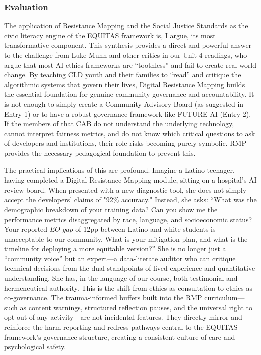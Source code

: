 \documentclass[11pt,twoside]{article}
\DeclareRobustCommand{\EOgap}{EO\text{-}gap\xspace}
\DeclareRobustCommand{\pp}{pp\xspace} %
\begin{document}
\newpage
\vspace{-0.3cm}
\subsubsection*{Evaluation}

\vspace{-0.3cm}
The application of Resistance Mapping and the Social Justice Standards as the civic literacy engine of the EQUITAS framework is, I argue, its most transformative component. This synthesis provides a direct and powerful answer to the challenge from Luke Munn and other critics in our Unit 4 readings, who argue that most AI ethics frameworks are “toothless” and fail to create real-world change. By teaching CLD youth and their families to “read” and critique the algorithmic systems that govern their lives, Digital Resistance Mapping builds the essential foundation for genuine community governance and accountability. It is not enough to simply create a Community Advisory Board (as suggested in Entry 1) or to have a robust governance framework like FUTURE-AI (Entry 2). If the members of that CAB do not understand the underlying technology, cannot interpret fairness metrics, and do not know which critical questions to ask of developers and institutions, their role risks becoming purely symbolic. RMP provides the necessary pedagogical foundation to prevent this.

The practical implications of this are profound. Imagine a Latino teenager, having completed a Digital Resistance Mapping module, sitting on a hospital's AI review board. When presented with a new diagnostic tool, she does not simply accept the developers' claims of "92\% accuracy." Instead, she asks: “What was the demographic breakdown of your training data? Can you show me the performance metrics disaggregated by race, language, and socioeconomic status? Your reported $\EOgap$ of 12\pp between Latino and white students is unacceptable to our community. What is your mitigation plan, and what is the timeline for deploying a more equitable version?” She is no longer just a “community voice” but an expert—a data-literate auditor who can critique technical decisions from the dual standpoints of lived experience and quantitative understanding. She has, in the language of our course, both testimonial and hermeneutical authority. This is the shift from ethics as consultation to ethics as co-governance. The trauma-informed buffers built into the RMP curriculum—such as content warnings, structured reflection pauses, and the universal right to opt-out of any activity—are not incidental features. They directly mirror and reinforce the harm-reporting and redress pathways central to the EQUITAS framework’s governance structure, creating a consistent culture of care and psychological safety.
\end{document}

